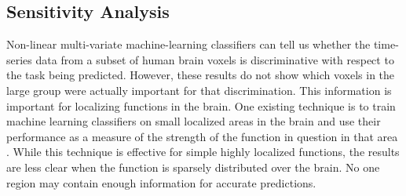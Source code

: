 \documentclass[preprint,5p,authoryear]{elsarticle}
\begin{document}
\subsection{Sensitivity Analysis}
Non-linear multi-variate machine-learning classifiers can tell us whether the time-series data from a subset of human brain voxels is discriminative with respect to the task being predicted. 
However, these results do not show which voxels in the large group were actually important for that discrimination.
This information is important for localizing functions in the brain.
One existing technique is to train machine learning classifiers on small localized areas in the brain and use their performance as a measure of the strength of the function in question in that area \citep{needRef3}.
While this technique is effective for simple highly localized functions, the results are less clear when the function is sparsely distributed over the brain.
No one region may contain enough information for accurate predictions.
\end{document}
